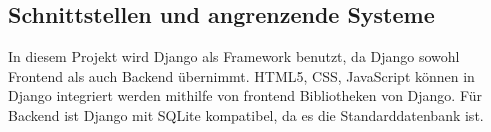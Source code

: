 \subsection{Schnittstellen und angrenzende Systeme} 
In diesem Projekt wird Django als Framework benutzt, da Django sowohl Frontend als auch Backend übernimmt. HTML5, CSS, JavaScript können in Django integriert werden mithilfe von frontend Bibliotheken von Django. Für Backend ist Django mit SQLite kompatibel, da es die Standarddatenbank ist.